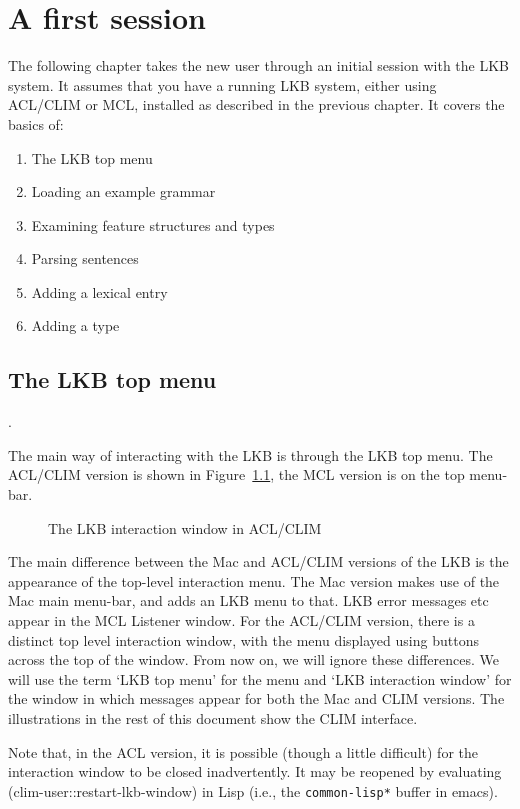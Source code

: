 \documentclass[12pt]{report}
\begin{document}
\chapter{A first session}
\label{firstsession}
The following chapter takes the new user through an initial session
with the LKB system.  It assumes that you have a running LKB system,
either using ACL/CLIM or MCL,
installed as described in the previous chapter.
It covers the basics of:
\begin{enumerate}
\item The LKB top menu
\item Loading an example grammar
\item Examining feature structures and types
\item Parsing sentences
\item Adding a lexical entry
\item Adding a type
\end{enumerate}


\section{The LKB top menu}
\label{topmenu}.

The main way of interacting with the LKB is through the LKB top menu.
The ACL/CLIM version is shown in Figure~\ref{lunix2}, the MCL version
is on the top menu-bar.
\begin{figure}
\caption{The LKB interaction window in ACL/CLIM}
\label{lunix2}
\end{figure}
The main difference between the Mac and ACL/CLIM versions of the
LKB is the appearance of the top-level interaction menu.
The Mac version makes use of the Mac main menu-bar, and adds an LKB
menu to that.  LKB error messages etc appear in the MCL
Listener window.  For the ACL/CLIM version, there is a distinct
top level interaction window, with the menu displayed using
buttons across the top of the window.  From now on,
we will ignore these differences.
We will use the term `LKB top menu' 
for the menu and `LKB interaction window' for the window in which messages 
appear
for both the Mac and CLIM versions.  The illustrations in 
the rest of this
document show the CLIM interface.

Note that, in the ACL version, it is possible (though 
a little difficult) for the interaction
window to be closed inadvertently.
It may be reopened by evaluating
(clim-user::restart-lkb-window) in Lisp (i.e., the
{\tt *common-lisp*} buffer in emacs).
\end{document}
